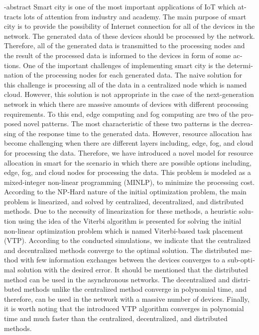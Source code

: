 \begin{latin}
  \en-abstract{
	Smart city is one of the most important applications of IoT which attracts lots of attention from industry and academy. The main purpose of smart city is to provide the possibility of Internet connection for all of the devices in the network. The generated data of these devices should be processed by the network. Therefore, all of the generated data is transmitted to the processing nodes and the result of the processed data is informed to the devices in form of some actions. One of the important challenges of implementing smart city is the determination of the processing nodes for each generated data. The naive solution for this challenge is processing all of the data in a centralized node which is named cloud. However, this solution is not appropriate in the case of the next-generation network in which there are massive amounts of devices with different processing requirements. To this end, edge computing and fog computing are two of the proposed novel patterns. The most characteristic of these two patterns is the decreasing of the response time to the generated data. However, resource allocation has become challenging when there are different layers including, edge, fog, and cloud for processing the data. Therefore, we have introduced a novel model for resource allocation in smart for the scenario in which there are possible options including, edge, fog, and cloud nodes for processing the data. 
	This problem is modeled as a mixed-integer non-linear programming (MINLP), to minimize the processing cost. According to the NP-Hard nature of the initial optimization problem, the main problem is linearized, and solved by centralized, decentralized, and distributed methods. Due to the necessity of linearization for these methods, a heuristic solution using the idea of the Viterbi algorithm is presented for solving the initial non-linear optimization problem which is named Viterbi-based task placement (VTP). 
	According to the conducted simulations, we indicate that the centralized and decentralized methods converge to the optimal solution. The distributed method with few information exchanges between the devices converges to a sub-optimal solution with the desired error. It should be mentioned that the distributed method can be used in the asynchronous networks. The decentralized and distributed methods unlike the centralized method converge in polynomial time, and therefore, can be used in the network with a massive number of devices. Finally, it is worth noting that the introduced VTP algorithm converges in polynomial time and much faster than the centralized, decentralized, and distributed methods.
  }

  \cleartoleftpage
  \latinabstractPage
  \cleartoleftpage
  \latinfirstPage
\end{latin}
